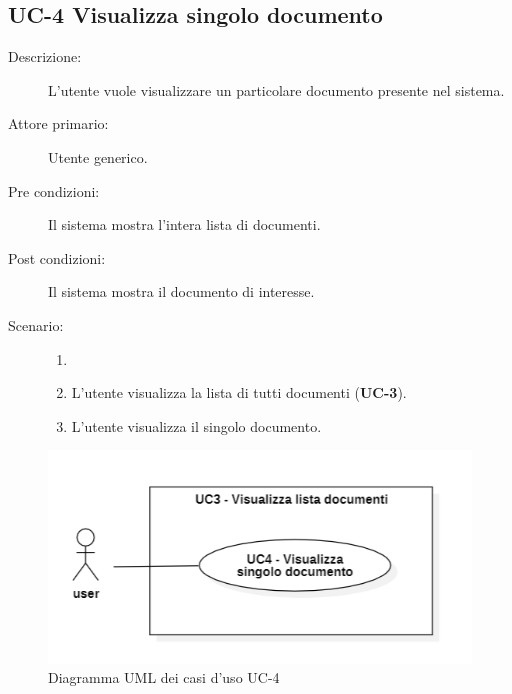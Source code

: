 \subsection{UC-4 Visualizza singolo documento}
\begin{description}
    \item[Descrizione:] L'utente vuole visualizzare un particolare documento presente nel sistema.
    \item[Attore primario:] Utente generico.
    \item[Pre condizioni:] Il sistema mostra l’intera lista di documenti.
    \item[Post condizioni:] Il sistema mostra il documento di interesse.
    \item[Scenario:]
    \begin{enumerate}
        \item[]
        \item L’utente visualizza la lista di tutti documenti (\textbf{UC-3}).
        \item L'utente visualizza il singolo documento.
    \end{enumerate} 
\end{description}

\begin{figure}[H]
    \centering
    \includegraphics[width=0.8\linewidth]{UC4.PNG}
    \caption{Diagramma UML dei casi d'uso UC-4}
    \label{fig:UC4}
\end{figure}

